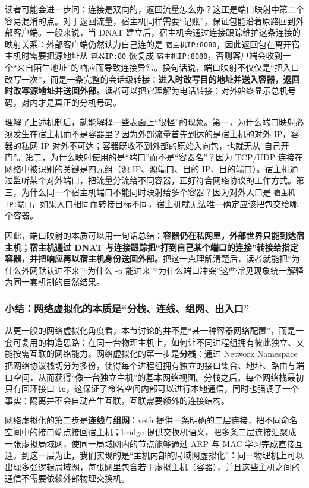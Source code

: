 读者可能会进一步问：连接是双向的，返回流量怎么办？这正是端口映射中第二个容易混淆的点。对于返回流量，宿主机同样需要“记账”，保证包能沿着原路回到外部客户端。一般来说，当 DNAT 建立后，宿主机会通过连接跟踪维护这条连接的映射关系：外部客户端仍然认为自己连的是 \texttt{宿主机IP:8080}，因此返回包在离开宿主机时需要把源地址从 \texttt{容器IP:80} 恢复成 \texttt{宿主机IP:8080}，否则客户端会收到一个“来自陌生地址”的响应而导致连接异常。换句话说，端口映射不仅仅是“把入口改写一次”，而是一条完整的会话级转接：\textbf{进入时改写目的地址并送入容器，返回时改写源地址并送回外部。}读者可以把它理解为电话转接：对外始终显示总机号码，对内才是真正的分机号码。

理解了上述机制后，就能解释一些表面上“很怪”的现象。第一，为什么端口映射必须发生在宿主机而不是容器里？因为外部流量首先到达的是宿主机的对外 IP，容器的私网 IP 对外不可达；容器既收不到外部的原始入向包，也就无从“自己开门”。第二，为什么映射使用的是“端口”而不是“容器名”？因为 TCP/UDP 连接在网络中被识别的关键是四元组（源 IP、源端口、目的 IP、目的端口）。宿主机通过监听某个对外端口，把流量分流给不同容器，正好符合网络协议的工作方式。第三，为什么同一个宿主机端口不能同时映射给多个容器？因为对外入口是 \texttt{宿主机IP:端口}，如果入口相同而转接目标不同，宿主机就无法唯一确定应该把包交给哪个容器。

因此，端口映射的本质可以用一句话总结：\textbf{容器仍在私网里，外部世界只能到达宿主机；宿主机通过 DNAT 与连接跟踪把“打到自己某个端口的连接”转接给指定容器，并把响应再以宿主机身份送回外部。}把这一点理解清楚后，读者就能把“为什么外网默认进不来”“为什么 -p 能进来”“为什么端口冲突”这些常见现象统一解释为同一套机制的自然结果。

\subsubsection{小结：网络虚拟化的本质是“分栈、连线、组网、出入口”}

从更一般的网络虚拟化角度看，本节讨论的并不是“某一种容器网络配置”，而是一套可复用的构造思路：在同一台物理主机上，如何让不同进程组拥有彼此独立、又能按需互联的网络能力。网络虚拟化的第一步是\textbf{分栈}：通过 Network Namespace 把网络协议栈切分为多份，使得每个进程组拥有独立的接口集合、地址、路由与端口空间，从而获得“像一台独立主机”的基本网络视图。分栈之后，每个网络栈最初只有回环接口 \texttt{lo}，这保证了命名空间内部可以进行本地通信，同时也强调了一个事实：隔离并不会自动产生互联，互联需要额外的连接结构。

网络虚拟化的第二步是\textbf{连线}与\textbf{组网}：veth 提供一条明确的二层连接，把不同命名空间中的接口端点接回宿主机；bridge 提供交换机语义，把多条二层连接汇聚成一张虚拟局域网，使同一局域网内的节点能够通过 ARP 与 MAC 学习完成直接互通。到这一层为止，我们实现的是“主机内部的局域网虚拟化”：同一物理机上可以出现多张逻辑局域网，每张网里包含若干虚拟主机（容器），并且这些主机之间的通信不需要依赖外部物理交换机。

